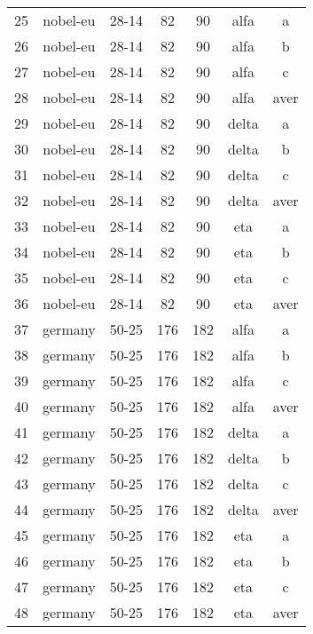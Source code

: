 \documentclass[final,5p,times,twocolumn]{elsarticle}
\begin{document}
\begin{table}[!htc]
\begin{center}
\begin{tabular}{ccccccc}
\hline                                                          
25	& nobel-eu   &  28-14	        &  82	    & 90	& alfa	 & a \\
26	& nobel-eu   &  28-14	        &  82	    & 90	& alfa	 & b \\
27	& nobel-eu   &  28-14	        &  82	    & 90	& alfa	 & c \\
28	& nobel-eu   &  28-14	        &  82	    & 90	& alfa	 & aver \\
29	& nobel-eu   &  28-14	        &  82	    & 90	& delta	 & a \\
30	& nobel-eu   &  28-14	        &  82	    & 90	& delta	 & b \\
31	& nobel-eu   &  28-14	        &  82	    & 90	& delta	 & c \\
32	& nobel-eu   &  28-14	        &  82	    & 90	& delta	 & aver \\
33	& nobel-eu   &  28-14	        &  82	    & 90	& eta	 & a \\
34	& nobel-eu   &  28-14	        &  82	    & 90	& eta	 & b \\
35	& nobel-eu   &  28-14	        &  82	    & 90	& eta	 & c \\
36	& nobel-eu   &  28-14	        &  82	    & 90	& eta    & aver \\
\hline  
37	& germany    &  50-25	        &  176	    & 182	& alfa	 & a \\
38	& germany    &  50-25	        &  176	    & 182	& alfa	 & b \\
39	& germany    &  50-25	        &  176	    & 182	& alfa	 & c \\
40	& germany    &  50-25	        &  176	    & 182	& alfa	 & aver \\
41	& germany    &  50-25	        &  176	    & 182	& delta	 & a \\
42	& germany    &  50-25	        &  176	    & 182	& delta	 & b \\
43	& germany    &  50-25	        &  176	    & 182	& delta	 & c \\
44	& germany    &  50-25	        &  176	    & 182	& delta	 & aver \\
45	& germany    &  50-25	        &  176	    & 182	& eta	 & a \\
46	& germany    &  50-25	        &  176	    & 182	& eta	 & b \\
47	& germany    &  50-25	        &  176	    & 182	& eta	 & c \\
48	& germany    &  50-25	        &  176	    & 182	& eta    & aver \\
\hline 
\end{tabular}
\end{center}
\label{tab:instances}
\end{table}
\end{document}
